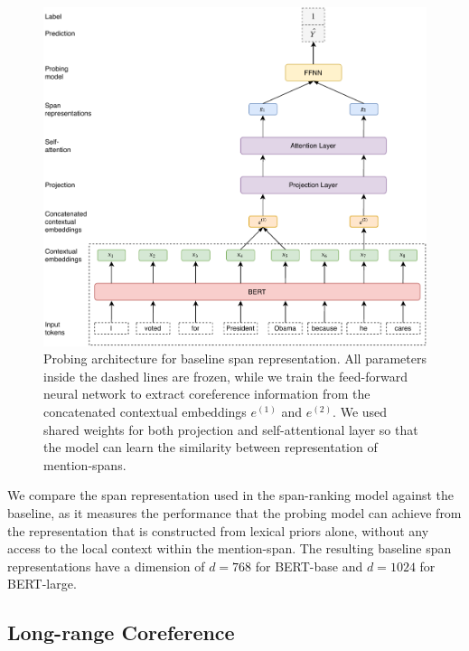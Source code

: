 \documentclass[11pt]{article}
\begin{document}
\begin{figure}[ht]
  \includegraphics[width=\textwidth]{baseline_span}
  \caption{Probing architecture for baseline span representation. All parameters inside the dashed lines are frozen, while we train the feed-forward neural network to extract coreference information from the concatenated contextual embeddings $e^{(1)}$ and $e^{(2)}$. We used shared weights for both projection and self-attentional layer so that the model can learn the similarity between representation of mention-spans.}
  \label{fig:baseline} 
\end{figure}

We compare the span representation used in the span-ranking model against the baseline, as it measures the performance that the probing model can achieve from the representation that is constructed from lexical priors alone, without any access to the local context within the mention-span. The resulting baseline span representations have a dimension of $d = 768$ for BERT-base and $d = 1024$ for BERT-large.

\subsection{Long-range Coreference}
\end{document}
